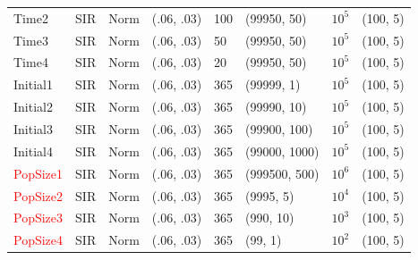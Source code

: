 \documentclass[12pt]{article}
\begin{document}
\begin{table}[]
\begin{tabular}{@{}llllllll@{}}
  Time2 & SIR &  Norm   & (.06, .03)                          &     100       &  (99950, 50)                    &  $10^5$          &(100, 5)                                \\
  Time3 & SIR &  Norm   & (.06, .03)                          &     50       &  (99950, 50)                    &  $10^5$          &(100, 5)                                \\
  Time4 & SIR &  Norm   & (.06, .03)                          &     20       &  (99950, 50)                    &  $10^5$          &(100, 5)                                \\ \midrule
  Initial1    & SIR      &   Norm             & (.06, .03)                          &     365       &  (99999, 1)                    &  $10^5$          &(100, 5)                                \\
  Initial2    & SIR      &   Norm             & (.06, .03)                          &     365       &  (99990, 10)                    &  $10^5$          &(100, 5)                                \\
  Initial3    & SIR      &   Norm             & (.06, .03)                          &     365       &  (99900, 100)                    &  $10^5$          &(100, 5)                                \\
  Initial4    & SIR      &   Norm             & (.06, .03)                          &     365       &  (99000, 1000)                    &  $10^5$          &(100, 5)                                \\ \midrule
  \textcolor{red}{PopSize1}        & SIR      &   Norm             & (.06, .03)                          &     365       &  (999500, 500)                    &  $10^6$          &(100, 5)                                \\
  \textcolor{red}{PopSize2}       & SIR      &   Norm             & (.06, .03)                          &     365       &  (9995, 5)                    &  $10^4$          &(100, 5)                                \\
  \textcolor{red}{PopSize3}        & SIR      &   Norm             & (.06, .03)                          &     365       &  (990, 10)                    &  $10^3$          &(100, 5)                                \\
  \textcolor{red}{PopSize4}        & SIR      &   Norm             & (.06, .03)                          &     365       &  (99, 1)                    &  $10^2$          &(100, 5)                                \\

\end{tabular}
\end{table}
\end{document}
